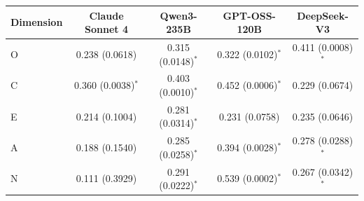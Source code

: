 \begin{tabular}{lcccc}
\toprule
Dimension & Claude Sonnet 4 & Qwen3-235B & GPT-OSS-120B & DeepSeek-V3 \\
\midrule
O & 0.238 (0.0618) & 0.315 (0.0148)$^{*}$ & 0.322 (0.0102)$^{*}$ & 0.411 (0.0008)$^{*}$ \\
C & 0.360 (0.0038)$^{*}$ & 0.403 (0.0010)$^{*}$ & 0.452 (0.0006)$^{*}$ & 0.229 (0.0674) \\
E & 0.214 (0.1004) & 0.281 (0.0314)$^{*}$ & 0.231 (0.0758) & 0.235 (0.0646) \\
A & 0.188 (0.1540) & 0.285 (0.0258)$^{*}$ & 0.394 (0.0028)$^{*}$ & 0.278 (0.0288)$^{*}$ \\
N & 0.111 (0.3929) & 0.291 (0.0222)$^{*}$ & 0.539 (0.0002)$^{*}$ & 0.267 (0.0342)$^{*}$ \\
\bottomrule
\end{tabular}
